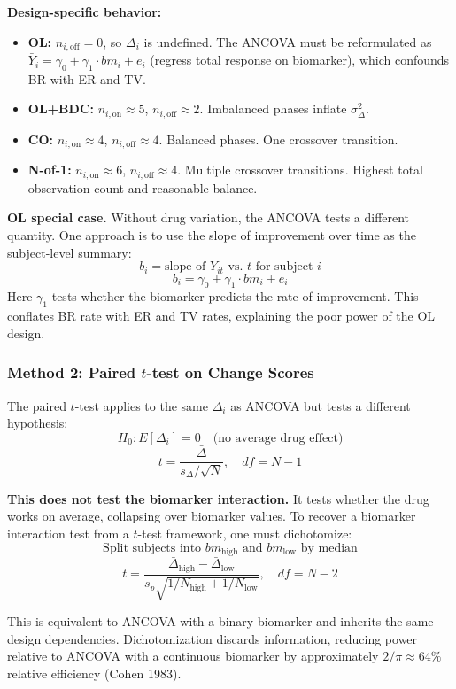 \documentclass[11pt,letterpaper]{article}
\begin{document}
\textbf{Design-specific behavior:}
\begin{itemize}[nosep]
\item \textbf{OL:} $n_{i,\text{off}} = 0$, so $\Delta_i$ is undefined.
  The ANCOVA must be reformulated as
  $\bar{Y}_i = \gamma_0 + \gamma_1 \cdot bm_i + e_i$ (regress total
  response on biomarker), which confounds BR with ER and TV.
\item \textbf{OL+BDC:} $n_{i,\text{on}} \approx 5$,
  $n_{i,\text{off}} \approx 2$. Imbalanced phases inflate
  $\sigma^2_\Delta$.
\item \textbf{CO:} $n_{i,\text{on}} \approx 4$,
  $n_{i,\text{off}} \approx 4$. Balanced phases. One crossover
  transition.
\item \textbf{N-of-1:} $n_{i,\text{on}} \approx 6$,
  $n_{i,\text{off}} \approx 4$. Multiple crossover transitions. Highest
  total observation count and reasonable balance.
\end{itemize}

\textbf{OL special case.} Without drug variation, the ANCOVA tests a
different quantity. One approach is to use the slope of improvement over
time as the subject-level summary:
\[
b_i = \text{slope of } Y_{it} \text{ vs.\ } t \text{ for subject } i
\]
\[
b_i = \gamma_0 + \gamma_1 \cdot bm_i + e_i
\]
Here $\gamma_1$ tests whether the biomarker predicts the rate of
improvement. This conflates BR rate with ER and TV rates, explaining the
poor power of the OL design.

\subsubsection{Method 2: Paired $t$-test on Change Scores}

The paired $t$-test applies to the same $\Delta_i$ as ANCOVA but tests
a different hypothesis:
\[
H_0: E[\Delta_i] = 0 \quad \text{(no average drug effect)}
\]
\[
t = \frac{\bar{\Delta}}{s_\Delta / \sqrt{N}}, \quad df = N - 1
\]

\textbf{This does not test the biomarker interaction.} It tests whether
the drug works on average, collapsing over biomarker values. To recover
a biomarker interaction test from a $t$-test framework, one must
dichotomize:
\[
\text{Split subjects into } bm_{\text{high}} \text{ and }
bm_{\text{low}} \text{ by median}
\]
\[
t = \frac{\bar{\Delta}_{\text{high}} -
\bar{\Delta}_{\text{low}}}{s_p \sqrt{1/N_{\text{high}} +
1/N_{\text{low}}}}, \quad df = N - 2
\]

This is equivalent to ANCOVA with a binary biomarker and inherits the
same design dependencies. Dichotomization discards information, reducing
power relative to ANCOVA with a continuous biomarker by approximately
$2/\pi \approx 64\%$ relative efficiency (Cohen 1983).
\end{document}
